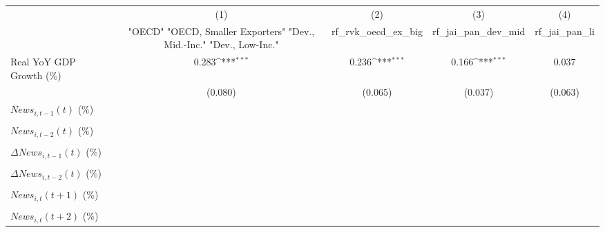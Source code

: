 {
\def\sym#1{\ifmmode^{#1}\else\(^{#1}\)\fi}
\begin{tabular}{l*{4}{c}}
\toprule
                    &\multicolumn{1}{c}{(1)}&\multicolumn{1}{c}{(2)}&\multicolumn{1}{c}{(3)}&\multicolumn{1}{c}{(4)}\\
                    &\multicolumn{1}{c}{ "OECD" "OECD, Smaller Exporters" "Dev., Mid.-Inc." "Dev., Low-Inc."}&\multicolumn{1}{c}{rf_rvk_oecd_ex_big}&\multicolumn{1}{c}{rf_jai_pan_dev_mid}&\multicolumn{1}{c}{rf_jai_pan_li}\\
\midrule
Real YoY GDP Growth (\%)&       0.283\sym{***}&       0.236\sym{***}&       0.166\sym{***}&       0.037         \\
                    &     (0.080)         &     (0.065)         &     (0.037)         &     (0.063)         \\
\addlinespace
$ News_{i,t-1}(t)$ (\%)&                     &                     &                     &                     \\
                    &                     &                     &                     &                     \\
\addlinespace
$ News_{i,t-2}(t)$ (\%)&                     &                     &                     &                     \\
                    &                     &                     &                     &                     \\
\addlinespace
$ \Delta News_{i,t-1}(t)$ (\%)&                     &                     &                     &                     \\
                    &                     &                     &                     &                     \\
\addlinespace
$ \Delta News_{i,t-2}(t)$ (\%)&                     &                     &                     &                     \\
                    &                     &                     &                     &                     \\
\addlinespace
$ News_{i,t}(t+1)$ (\%)&                     &                     &                     &                     \\
                    &                     &                     &                     &                     \\
\addlinespace
$ News_{i,t}(t+2)$ (\%)&                     &                     &                     &                     \\

\end{tabular}}
